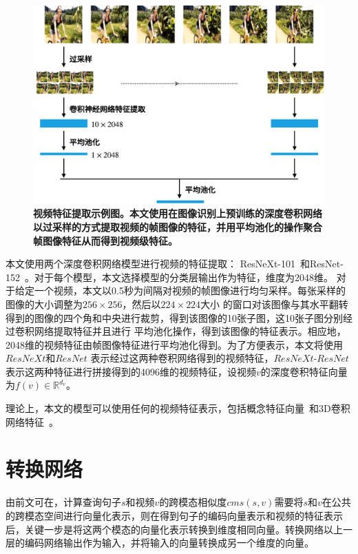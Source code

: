 \begin{figure}[tbh!]
    \centering
    \includegraphics[width=\linewidth]{figures/video-cnn-feat}
    \caption[视频特征提取示例图]{\textbf{视频特征提取示例图。本文使用在图像识别上预训练的深度卷积网络以过采样的方式提取视频的帧图像的特征，并用平均池化的操作聚合帧图像特征从而得到视频级特征。}}
    \label{fig:video-cnn-feat}
\end{figure}

本文使用两个深度卷积网络模型进行视频的特征提取：
ResNeXt-101~\cite{xie2017aggregated}和ResNet-152~\cite{he2016deep}。对于每个模型，本文选择模型的分类层输出作为特征，维度为2048维。
对于给定一个视频，本文以0.5秒为间隔对视频的帧图像进行均匀采样。每张采样的图像的大小调整为$256\times256$，然后以$224\times224$大小
的窗口对该图像与其水平翻转得到的图像的四个角和中央进行裁剪，得到该图像的10张子图，这10张子图分别经过卷积网络提取特征并且进行
平均池化操作，得到该图像的特征表示。相应地，2048维的视频特征由帧图像特征进行平均池化得到。为了方便表示，本文将使用$ResNeXt$和$ResNet$
表示经过这两种卷积网络得到的视频特征，$ResNeXt$-$ResNet$表示这两种特征进行拼接得到的4096维的视频特征，设视频$v$的深度卷积特征向量为$f(v) \in \mathbb{R}^{d_v}$。

理论上，本文的模型可以使用任何的视频特征表示，包括概念特征向量~\cite{markatopoulou2017query,lu2016event,merler2012semantic}和3D卷积网络特征~\cite{mithun2018learning}。

\section{转换网络}
由前文可在，计算查询句子$s$和视频$v$的跨模态相似度$cms(s,v)$需要将$s$和$v$在公共的跨模态空间进行向量化表示，则在得到句子的编码向量表示和视频的特征表示后，关键一步是将这两个模态的向量化表示转换到维度相同向量。转换网络以上一层的编码网络输出作为输入，并将输入的向量转换成另一个维度的向量。

